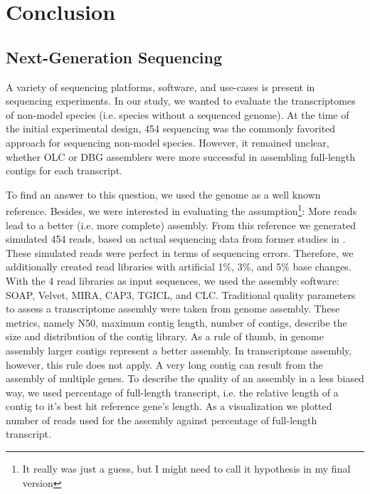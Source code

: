 \chapter{Conclusion}
 \section{Next-Generation Sequencing}
	A variety of sequencing platforms, software, and use-cases is present in sequencing experiments.
	In our study, we wanted to evaluate the transcriptomes of non-model species (i.e. species without a sequenced genome).
	At the time of the initial experimental design, 454 sequencing was the commonly favorited approach for sequencing non-model species.
	However, it remained unclear, whether \ac{OLC} or \ac{DBG} assemblers were more successful in assembling full-length contigs for each transcript.
	
	To find an answer to this question, we used the  genome as a well known reference.
	Besides, we were interested in evaluating the assumption\footnote{It really was just a guess, but I might need to call it hypothesis in my final version}: More reads lead to a better (i.e. more complete) assembly.
	From this reference we generated simulated 454 reads, based on actual sequencing data from former studies in  \cite{op_Braeutigam2010}.
	These simulated reads were perfect in terms of sequencing errors.
	Therefore, we additionally created read libraries with artificial 1\%, 3\%, and 5\% base changes.
	With the 4 read libraries as input sequences, we used the assembly software:     \ac{SOAP}\cite{unknown}, \ac{Velvet}\cite{unknown}, \ac{MIRA}\cite{unknown}, \ac{CAP3}\cite{unknown}, \ac{TGICL}\cite{unknown}, and \ac{CLC}\cite{CLC}.
	Traditional quality parameters to assess a  transcriptome assembly were taken from genome assembly.
	These metrics, namely N50, maximum contig length, number of contigs, describe the size and distribution of the contig library.
	As a rule of thumb, in genome assembly larger contigs represent a better assembly.
	In transcriptome assembly, however, this rule does not apply.
	A very long contig can result from the assembly of multiple genes.
	To describe the quality of an assembly in a less biased way, we used percentage of full-length transcript, i.e. the relative length of a contig to it's best hit reference gene's length.
	As a visualization we plotted number of reads used for the assembly against percentage of full-length transcript.
	
